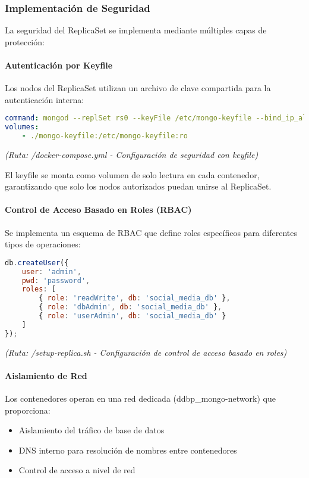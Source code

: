 \documentclass[12pt,letterpaper]{article}
\begin{document}
\subsubsection{Implementación de Seguridad}
La seguridad del ReplicaSet se implementa mediante múltiples capas de protección:

\paragraph{Autenticación por Keyfile}
Los nodos del ReplicaSet utilizan un archivo de clave compartida para la autenticación interna:

\begin{lstlisting}[language=yaml]
command: mongod --replSet rs0 --keyFile /etc/mongo-keyfile --bind_ip_all --auth --port 27017
volumes:
    - ./mongo-keyfile:/etc/mongo-keyfile:ro
\end{lstlisting}
\textit{(Ruta: /docker-compose.yml - Configuración de seguridad con keyfile)}

El keyfile se monta como volumen de solo lectura en cada contenedor, garantizando que solo los nodos autorizados puedan unirse al ReplicaSet.

\paragraph{Control de Acceso Basado en Roles (RBAC)}
Se implementa un esquema de RBAC que define roles específicos para diferentes tipos de operaciones:

\begin{lstlisting}[language=javascript]
db.createUser({
    user: 'admin',
    pwd: 'password',
    roles: [
        { role: 'readWrite', db: 'social_media_db' },
        { role: 'dbAdmin', db: 'social_media_db' },
        { role: 'userAdmin', db: 'social_media_db' }
    ]
});
\end{lstlisting}
\textit{(Ruta: /setup-replica.sh - Configuración de control de acceso basado en roles)}

\paragraph{Aislamiento de Red}
Los contenedores operan en una red dedicada (ddbp\_mongo-network) que proporciona:

\begin{itemize}
    \item Aislamiento del tráfico de base de datos
    \item DNS interno para resolución de nombres entre contenedores
    \item Control de acceso a nivel de red
\end{itemize}
\end{document}
